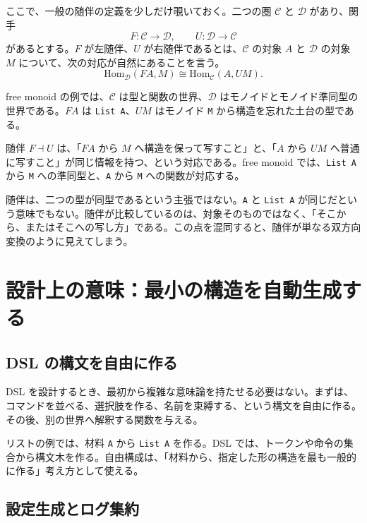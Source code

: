 ここで、一般の随伴の定義を少しだけ覗いておく。二つの圏 \(\mathcal{C}\) と \(\mathcal{D}\) があり、関手
\[
  F : \mathcal{C} \to \mathcal{D},
  \qquad
  U : \mathcal{D} \to \mathcal{C}
\]
があるとする。\(F\) が左随伴、\(U\) が右随伴であるとは、\(\mathcal{C}\) の対象 \(A\) と \(\mathcal{D}\) の対象 \(M\) について、次の対応が自然にあることを言う。
\[
  \mathrm{Hom}_{\mathcal{D}}(F A, M)
  \cong
  \mathrm{Hom}_{\mathcal{C}}(A, U M).
\]

free monoid の例では、\(\mathcal{C}\) は型と関数の世界、\(\mathcal{D}\) はモノイドとモノイド準同型の世界である。\(F A\) は \texttt{List A}、\(U M\) はモノイド \texttt{M} から構造を忘れた土台の型である。

\begin{definitionbox}
随伴 \(F \dashv U\) は、「\(F A\) から \(M\) へ構造を保って写すこと」と、「\(A\) から \(U M\) へ普通に写すこと」が同じ情報を持つ、という対応である。free monoid では、\texttt{List A} から \texttt{M} への準同型と、\texttt{A} から \texttt{M} への関数が対応する。
\end{definitionbox}

\begin{warningbox}
随伴は、二つの型が同型であるという主張ではない。\texttt{A} と \texttt{List A} が同じだという意味でもない。随伴が比較しているのは、対象そのものではなく、「そこから、またはそこへの写し方」である。この点を混同すると、随伴が単なる双方向変換のように見えてしまう。
\end{warningbox}

\section{設計上の意味：最小の構造を自動生成する}
\label{sec:ch31-design}

\subsection{DSL の構文を自由に作る}

DSL を設計するとき、最初から複雑な意味論を持たせる必要はない。まずは、コマンドを並べる、選択肢を作る、名前を束縛する、という構文を自由に作る。その後、別の世界へ解釈する関数を与える。

リストの例では、材料 \texttt{A} から \texttt{List A} を作る。DSL では、トークンや命令の集合から構文木を作る。自由構成は、「材料から、指定した形の構造を最も一般的に作る」考え方として使える。

\subsection{設定生成とログ集約}

